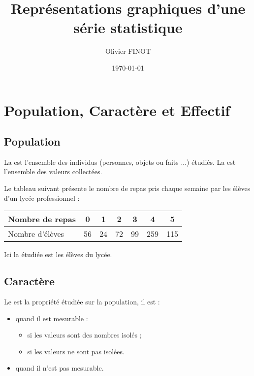 \documentclass[12pt,a4paper]{article}
\author{Olivier FINOT}
\date{\today}
\title{Représentations graphiques d'une série statistique }
\begin{document}
\maketitle

\section{Population, Caractère et Effectif}

\subsection{Population}
\begin{mydefs}
La  est l'ensemble des individus (personnes, objets ou faits ...) étudiés.
La  est l'ensemble des valeurs collectées.
\end{mydefs}


\begin{myex}
	
	Le tableau suivant présente le nombre de repas pris chaque semaine par les élèves d'un lycée professionnel :
	
	\begin{center}
		\begin{tabular}{|@{\ }l@{\ }|@{\ }c@{\ }|@{\ }c@{\ }|@{\ }c@{\ }|@{\ }c@{\ }|@{\ }c@{\ }|@{\ }c@{\ }|}
			\hline
			Nombre de repas & 0 & 1 & 2 & 3 & 4 & 5 \\ \hline
			Nombre d'élèves & 56 & 24 & 72 & 99 & 259 & 115 \\ \hline
		\end{tabular}
	\end{center}
	
	Ici la  étudiée est les élèves du lycée.
\end{myex}


\subsection{Caractère}

\begin{mydef}

Le  est la propriété étudiée sur la population, il est :
\begin{itemize}
	\item {} quand il est mesurable :
		\begin{itemize}
			\item {} si les valeurs sont des nombres isolés ;
			\item {} si les valeurs ne sont pas isolées. %
		\end{itemize}
	\item {} quand il n'est pas mesurable. %
\end{itemize}
\end{mydef}
\end{document}
